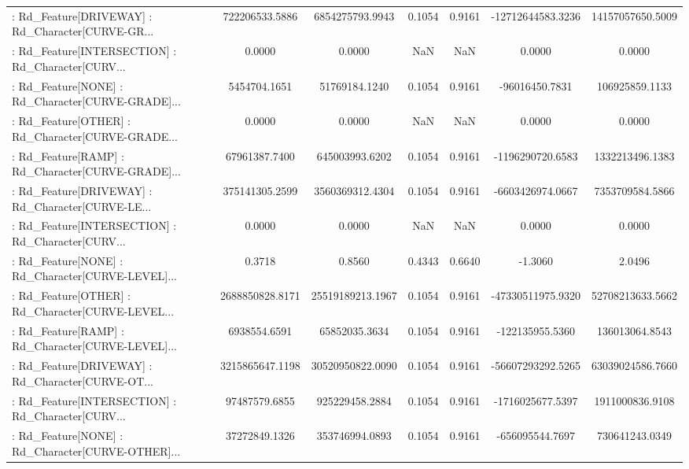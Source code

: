 \begin{longtable}{p{4cm}cccccc}
 : Rd\_Feature[DRIVEWAY] : Rd\_Character[CURVE-GR... &    722206533.5886 &   6854275793.9943 &  0.1054 &       0.9161 &  -12712644583.3236 &  14157057650.5009 \\
 : Rd\_Feature[INTERSECTION] : Rd\_Character[CURV... &            0.0000 &            0.0000 &     NaN &          NaN &             0.0000 &            0.0000 \\
 : Rd\_Feature[NONE] : Rd\_Character[CURVE-GRADE]... &      5454704.1651 &     51769184.1240 &  0.1054 &       0.9161 &     -96016450.7831 &    106925859.1133 \\
 : Rd\_Feature[OTHER] : Rd\_Character[CURVE-GRADE... &            0.0000 &            0.0000 &     NaN &          NaN &             0.0000 &            0.0000 \\
 : Rd\_Feature[RAMP] : Rd\_Character[CURVE-GRADE]... &     67961387.7400 &    645003993.6202 &  0.1054 &       0.9161 &   -1196290720.6583 &   1332213496.1383 \\
 : Rd\_Feature[DRIVEWAY] : Rd\_Character[CURVE-LE... &    375141305.2599 &   3560369312.4304 &  0.1054 &       0.9161 &   -6603426974.0667 &   7353709584.5866 \\
 : Rd\_Feature[INTERSECTION] : Rd\_Character[CURV... &            0.0000 &            0.0000 &     NaN &          NaN &             0.0000 &            0.0000 \\
 : Rd\_Feature[NONE] : Rd\_Character[CURVE-LEVEL]... &            0.3718 &            0.8560 &  0.4343 &       0.6640 &            -1.3060 &            2.0496 \\
 : Rd\_Feature[OTHER] : Rd\_Character[CURVE-LEVEL... &   2688850828.8171 &  25519189213.1967 &  0.1054 &       0.9161 &  -47330511975.9320 &  52708213633.5662 \\
 : Rd\_Feature[RAMP] : Rd\_Character[CURVE-LEVEL]... &      6938554.6591 &     65852035.3634 &  0.1054 &       0.9161 &    -122135955.5360 &    136013064.8543 \\
 : Rd\_Feature[DRIVEWAY] : Rd\_Character[CURVE-OT... &   3215865647.1198 &  30520950822.0090 &  0.1054 &       0.9161 &  -56607293292.5265 &  63039024586.7660 \\
 : Rd\_Feature[INTERSECTION] : Rd\_Character[CURV... &     97487579.6855 &    925229458.2884 &  0.1054 &       0.9161 &   -1716025677.5397 &   1911000836.9108 \\
 : Rd\_Feature[NONE] : Rd\_Character[CURVE-OTHER]... &     37272849.1326 &    353746994.0893 &  0.1054 &       0.9161 &    -656095544.7697 &    730641243.0349 \\

\end{longtable}
